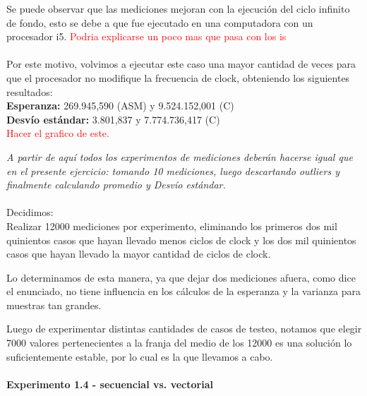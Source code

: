 Se puede observar que las mediciones mejoran con la ejecuci\'on del ciclo infinito de fondo, esto se debe a que fue ejecutado en una computadora con un procesador i5. \textcolor{red}{Podria explicarse un poco mas que pasa con los is}\\
\\
\indent Por este motivo, volvimos a ejecutar este caso una mayor cantidad de veces para que el procesador no modifique la frecuencia de clock, obteniendo los siguientes resultados: \\
\textbf{Esperanza:} 269.945,590 (ASM) y 9.524.152,001 (C) \\
\textbf{Desv\'io est\'andar:} 3.801,837 y 7.774.736,417 (C) \\
\textcolor{red}{Hacer el grafico de este.}\\
\bigskip

\textit{A partir de aquí todos los experimentos de mediciones deberán hacerse igual 
que en el presente ejercicio: tomando 10 mediciones, luego descartando 
outliers y finalmente calculando promedio y Desvío est\'andar.}\\
\\
Decidimos: \\

Realizar 12000 mediciones por experimento, eliminando los primeros dos mil quinientos casos que hayan llevado menos ciclos de clock y los dos mil quinientos casos que hayan llevado la mayor cantidad de ciclos de clock. 

Lo determinamos de esta manera, ya que dejar dos mediciones afuera, como dice el enunciado, no tiene influencia en los c\'alculos de la esperanza y la varianza para muestras tan grandes. 

Luego de experimentar distintas cantidades de casos de testeo, notamos que elegir 7000 valores pertenecientes a la franja del medio de los 12000 es una soluci\'on lo suficientemente estable, por lo cual es la que llevamos a cabo. \\
\\
\newpage
\noindent\textbf{Experimento 1.4 - secuencial vs. vectorial}

